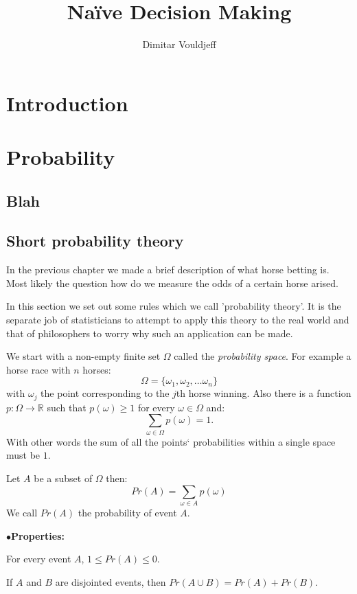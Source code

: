 \documentclass[12pt, a4paper,leqno]{report}
\title{Naïve Decision Making}
\author{Dimitar Vouldjeff}
\theoremstyle{normal}
\theoremstyle{normal}
\begin{document}
	\maketitle
	\tableofcontents
	
	\chapter{Introduction}
	
	
	\chapter{Probability}
	
	\section{Blah}
	
	
	\section{Short probability theory}
	In the previous chapter we made a brief description of what horse betting is. Most likely the question how do we measure the odds of a certain horse arised.
	
	In this section we set out some rules which we call 'probability theory'. It is the separate job of statisticians to attempt to apply this theory to the real world and that of philosophers to worry why such an application can be made.
	
	We start with a non-empty finite set $\Omega$ called the \textit{probability space}. For example a horse race with $n$ horses:
	\[ \Omega = \lbrace \omega_1, \omega_2, \dots\omega_n \rbrace \]
	with $\omega_j$ the point corresponding to the $j$th horse winning.
	Also there is a function $p : \Omega \rightarrow \mathbb{R}$ such that $p(\omega)\geq 1$ for every $\omega\in\Omega$ and:
	\[ \sum\limits_{\omega\in\Omega} p(\omega) = 1. \]
	With other words the sum of all the points` probabilities within a single space must be $1$.
	
	Let $A$ be a subset of $\Omega$ then:
	\[ Pr(A) = \sum\limits_{\omega\in A} p(\omega) \]
	We call $Pr(A)$ the probability of event $A$.\\
	\begin{list}{$\bullet$}{\textbf{Properties:}}
		\item For every event $A$, $1 \leq Pr(A) \leq 0$.
		\item If $A$ and $B$ are disjointed events, then $Pr(A\cup B) = Pr(A) + Pr(B)$.
	\end{list}
	
\end{document}
